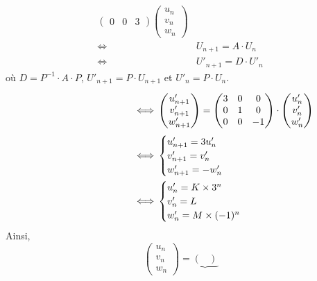 \begin{exo}
\begin{enumerate}
\begin{align*}
\begin{pmatrix}
					0&0&3
				\end{pmatrix} \begin{pmatrix}
					u_n\\ v_n\\ w_n
				\end{pmatrix}\\
				\iff& U_{n+1} = A\cdot U_n\\
				\iff& U'_{n+1} = D \cdot U'_{n}
			\end{align*}
			où $D = P^{-1} \cdot A \cdot P$, $U'_{n+1} = P\cdot U_{n+1}$\/ et $U'_n = P\cdot U_n$.
			\begin{align*}
				\phantom{\begin{rcases*}
					\hfill mm_{n+1} = v_n + 2w_n\\
					\hfill v_{n+1} = u_n + 2w_n\\
					\hfill w_{n+1} = 3w_n
				\end{rcases*}} \iff&
				\begin{pmatrix}
					u'_{n+1}\\v'_{n+1}\\w'_{n+1}
				\end{pmatrix} = \begin{pmatrix}
					3&0&0\\
					0&1&0\\
					0&0&-1
				\end{pmatrix} \cdot \begin{pmatrix}
					u'_n\\
					v'_n\\
					w'_n
				\end{pmatrix}\\
				\iff& \begin{cases}
					u'_{n+1} = 3u'_n\\
					v'_{n+1} = v'_n\\
					w'_{n+1} = -w'_n
				\end{cases}\\
				\iff& \begin{cases}
					u'_n = K\times  3^n\\
					v'_n = L\\
					w'_n = M \times (-1)^n
				\end{cases}
			\end{align*}
			Ainsi, \[
				\begin{pmatrix}
					u_n\\v_n\\w_n
				\end{pmatrix} = \underbrace{\begin{pmatrix}

\end{pmatrix}}\]
\end{enumerate}
\end{exo}
